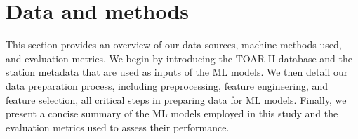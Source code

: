 \documentclass[gmd, manuscript]{copernicus}
\begin{document}

\section{Data and methods}\label{data_method}
This section provides an overview of our data sources, machine methods used, and evaluation metrics. We begin by introducing the TOAR-II database and the station metadata that are used as inputs of the ML models. We then detail our data preparation process, including preprocessing, feature engineering, and feature selection, all critical steps in preparing data for ML models. Finally, we present a concise summary of the ML models employed in this study and the evaluation metrics used to assess their performance.


\end{document}
